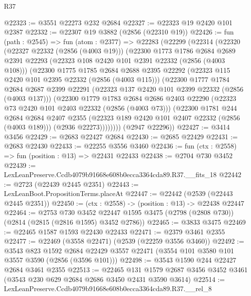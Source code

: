 \begin{lexlean}{R37}
\begin{coremodule}
@22323 := @3551 @22273 @232 @2684
@22327 := @22323 @19 @2420 @101 @2387
@22332 := @22307 @19 @3882 (@2856 (@22310 @19))
@22426 := fun (path : @2545) =>
  fun (atom : @2377) =>
  @22283
    (@22299
      (@22314
        (@22320
          (@22327 @22332 (@2856 (@4003 @19)))
          (@22300
            @1773
            @1786
            @2684
            @2689
            @2391
            @22293
            (@22323 @108 @2420 @101 @2391 @22332 (@2856 (@4003 @108)))
            (@22300
              @1775
              @1785
              @2684
              @2688
              @2395
              @22292
              (@22323 @115 @2420 @101 @2395 @22332 (@2856 (@4003 @115)))
              (@22300
                @1777
                @1784
                @2684
                @2687
                @2399
                @22291
                (@22323 @137 @2420 @101 @2399 @22332 (@2856 (@4003 @137)))
                (@22300
                  @1779
                  @1783
                  @2684
                  @2686
                  @2403
                  @22290
                  (@22323 @73 @2420 @101 @2403 @22332 (@2856 (@4003 @73)))
                  (@22300
                    @1781
                    @244
                    @2684
                    @2684
                    @2407
                    @2355
                    (@22323 @189 @2420 @101 @2407 @22332 (@2856 (@4003 @189)))
                    (@2936 @22273))))))))
      (@2947 @22296))
@22427 := @3414 @3456
@22429 := @2683 @22427 @2684
@22430 := @2685 @22429
@22431 := @2683 @22430
@22433 := @22255 @3556 @3460
@22436 := fun (ctx : @2558) => fun (position : @13) => @22431 @22433
@22438 := @2704 @730 @3452
@22439 := LexLeanPreserve.Ccdb4079b91668e608b0ecca3364cda89.R37.__fits_18
@22442 := @2723 (@22439 @2445 @2351)
@22443 := LexLeanBoot.PropositionTerms.placeAt
@22447 := @22442 (@2539 (@22443 @2445 @2351))
@22450 := (ctx : @2558) -> (position : @13) -> @22438 @22447
@22464 := @2753
    @730
    @3452
    @22447
    @1595
    @3475
    (@2798 (@2808 @730))
    (@2814 (@2815 (@2816 @1595) @3452 @2786))
@22465 := @3833 @3475
@22469 := @22465 @1587 @1593 @22430 @22433
@22471 := @2379 @3461 @2355
@22477 := @22469 (@3558 @22471) (@2539 (@22259 @3556 @3460))
@22492 := @3543
    @823
    @1592
    @2684
    @22429
    @3557
    @22471
    (@3554 @101 @3580 @101 @3557 @3590 (@2856 (@3596 @101)))
@22498 := @3543 @1590 @244 @22427 @2684 @3461 @2355
@22513 := @22465
    @131
    @1579
    @2687
    @3456
    @3452
    @3461
    (@3543 @230 @629 @2684 @2686 @3450 @2431 @3590 @3614)
@22514 := LexLeanPreserve.Ccdb4079b91668e608b0ecca3364cda89.R37.__rel_8

\end{coremodule}
\end{lexlean}

